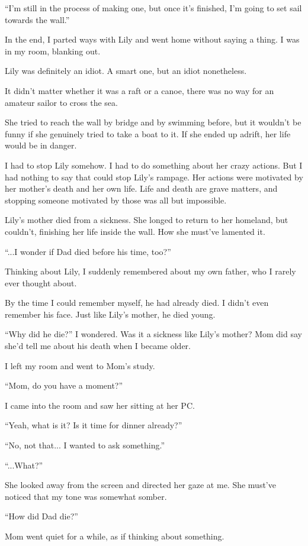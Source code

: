 ``I'm still in the process of making one, but once it's finished, I'm going to set sail towards the wall.''

In the end, I parted ways with Lily and went home without saying a thing. I was in my room, blanking out.

Lily was definitely an idiot. A smart one, but an idiot nonetheless.

It didn't matter whether it was a raft or a canoe, there was no way for an amateur sailor to cross the sea.

She tried to reach the wall by bridge and by swimming before, but it wouldn't be funny if she genuinely tried to take a boat to it. If she ended up adrift, her life would be in danger.

I had to stop Lily somehow. I had to do something about her crazy actions. But I had nothing to say that could stop Lily's rampage. Her actions were motivated by her mother's death and her own life. Life and death are grave matters, and stopping someone motivated by those was all but impossible.

Lily's mother died from a sickness. She longed to return to her homeland, but couldn't, finishing her life inside the wall. How she must've lamented it.

``...I wonder if Dad died before his time, too?''

Thinking about Lily, I suddenly remembered about my own father, who I rarely ever thought about.

By the time I could remember myself, he had already died. I didn't even remember his face. Just like Lily's mother, he died young.

``Why did he die?'' I wondered. Was it a sickness like Lily's mother? Mom did say she'd tell me about his death when I became older.

I left my room and went to Mom's study.

``Mom, do you have a moment?''

I came into the room and saw her sitting at her PC.

``Yeah, what is it? Is it time for dinner already?''

``No, not that... I wanted to ask something.''

``...What?''

She looked away from the screen and directed her gaze at me. She must've noticed that my tone was somewhat somber.

``How did Dad die?''

Mom went quiet for a while, as if thinking about something.

